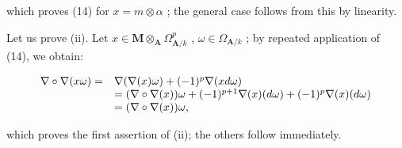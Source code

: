 which proves (14) for \(x = m \otimes \alpha\) ; the general case follows from this by linearity.

Let us prove (ii). Let \(x \in \mathbf{M} \otimes_{\mathbf{A}} \Omega_{\mathbf{A}/k}^{p}\) , \(\omega \in \Omega_{\mathbf{A}/k}\) ; by repeated application of (14), we obtain:

\[
\begin{array}{r l} \nabla \circ \nabla (x \omega) = & \nabla (\nabla (x) \omega) + (- 1) ^ {p} \nabla (x d \omega) \\ & = (\nabla \circ \nabla (x)) \omega + (- 1) ^ {p + 1} \nabla (x) (d \omega) + (- 1) ^ {p} \nabla (x) (d \omega) \\ & = (\nabla \circ \nabla (x)) \omega , \end{array}
\]

which proves the first assertion of (ii); the others follow immediately.

